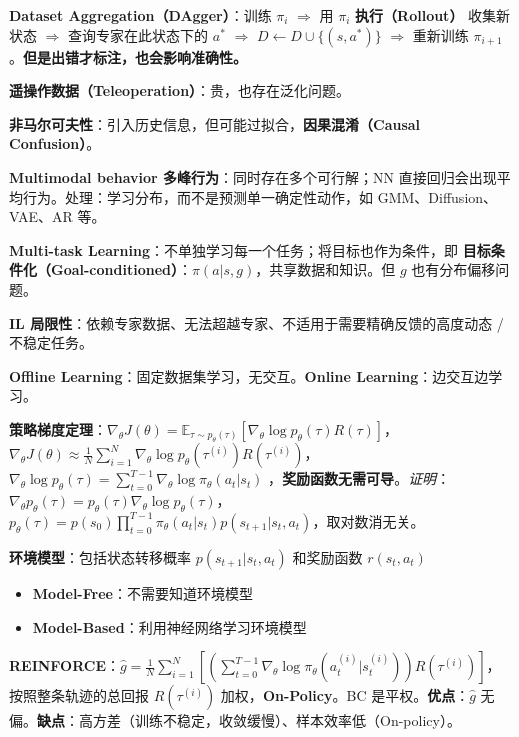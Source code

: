 \documentclass[
  8pt]{extarticle}
\providecommand{\tightlist}{%
  \setlength{\itemsep}{0pt}\setlength{\parskip}{0pt}}
\begin{document}
\begin{multicols*}{4}
\textbf{Dataset Aggregation（DAgger）}：训练 \(\pi_i\) \(\Rightarrow\)
用 \(\pi_i\) \textbf{执行（Rollout）} 收集新状态 \(\Rightarrow\)
查询专家在此状态下的 \(a^*\) \(\Rightarrow\)
\(D \leftarrow D \cup \{(s, a^*)\}\) \(\Rightarrow\) 重新训练
\(\pi_{i+1}\)。\textbf{但是出错才标注，也会影响准确性。}

\textbf{遥操作数据（Teleoperation）}：贵，也存在泛化问题。

\textbf{非马尔可夫性}：引入历史信息，但可能过拟合，\textbf{因果混淆（Causal
Confusion）}。

\textbf{Multimodal behavior 多峰行为}：同时存在多个可行解；NN
直接回归会出现平均行为。处理：学习分布，而不是预测单一确定性动作，如
GMM、Diffusion、VAE、AR 等。

\textbf{Multi-task Learning}：不单独学习每一个任务；将目标也作为条件，即
\textbf{目标条件化（Goal-conditioned）}：\(\pi(a|s, g)\)，共享数据和知识。但
\(g\) 也有分布偏移问题。

\textbf{IL
局限性}：依赖专家数据、无法超越专家、不适用于需要精确反馈的高度动态 /
不稳定任务。

\textbf{Offline Learning}：固定数据集学习，无交互。\textbf{Online
Learning}：边交互边学习。

\textbf{策略梯度定理}：\(\nabla_\theta J(\theta) = \mathbb{E}_{\tau \sim p_\theta(\tau)} [\nabla_\theta \log p_\theta(\tau) R(\tau)]\)，\(\nabla_\theta J(\theta) \approx \frac{1}{N} \sum_{i=1}^{N} \nabla_\theta \log p_\theta(\tau^{(i)}) R(\tau^{(i)})\)，\(\nabla_\theta \log p_\theta(\tau) = \sum_{t=0}^{T-1} \nabla_\theta \log \pi_\theta(a_t | s_t)\)
，\textbf{奖励函数无需可导}。\emph{证明}：\(\nabla_\theta p_\theta(\tau) = p_\theta(\tau) \nabla_\theta \log p_\theta(\tau)\)，\(p_\theta(\tau) = p(s_0) \prod_{t=0}^{T-1} \pi_\theta(a_t | s_t) p(s_{t+1} | s_t, a_t)\)，取对数消无关。

\textbf{环境模型}：包括状态转移概率 \(p(s_{t+1} | s_t, a_t)\) 和奖励函数
\(r(s_t, a_t)\)

\begin{itemize}
\tightlist
\item
  \textbf{Model-Free}：不需要知道环境模型
\item
  \textbf{Model-Based}：利用神经网络学习环境模型
\end{itemize}

\textbf{REINFORCE}：\(\hat{g} = \frac{1}{N} \sum_{i=1}^{N} \left[ \left( \sum_{t=0}^{T-1} \nabla_\theta \log \pi_\theta(a_t^{(i)} | s_t^{(i)}) \right) R(\tau^{(i)}) \right]\)，按照整条轨迹的总回报
\(R(\tau^{(i)})\) 加权，\textbf{On-Policy}。BC
是平权。\textbf{优点}：\(\hat{g}\)
无偏。\textbf{缺点}：高方差（训练不稳定，收敛缓慢）、样本效率低（On-policy）。


\end{multicols*}
\end{document}
